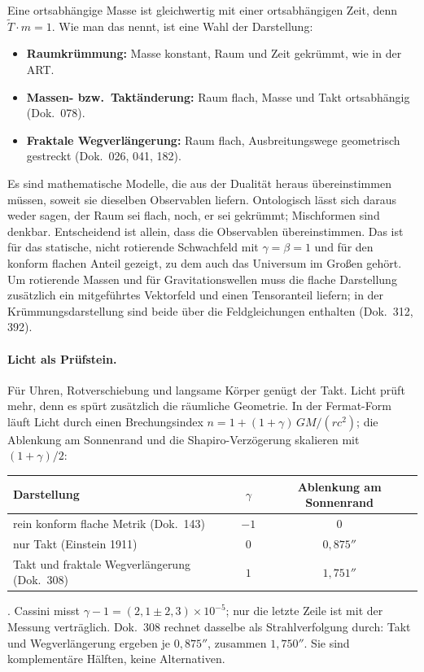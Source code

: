 Eine ortsabhängige Masse ist gleichwertig mit einer ortsabhängigen Zeit, denn
$\tilde T\cdot m=1$. Wie man das nennt, ist eine Wahl der Darstellung:
\begin{itemize}[leftmargin=*,itemsep=1pt]
\item \textbf{Raumkrümmung:} Masse konstant, Raum und Zeit gekrümmt, wie in der ART.
\item \textbf{Massen- bzw.\ Taktänderung:} Raum flach, Masse und Takt ortsabhängig (Dok.~078).
\item \textbf{Fraktale Wegverlängerung:} Raum flach, Ausbreitungswege geometrisch gestreckt
(Dok.~026, 041, 182).
\end{itemize}
Es sind mathematische Modelle, die aus der Dualität heraus übereinstimmen müssen, soweit sie
dieselben Observablen liefern. Ontologisch lässt sich daraus weder sagen, der Raum sei flach,
noch, er sei gekrümmt; Mischformen sind denkbar. Entscheidend ist allein, dass die Observablen
übereinstimmen. Das ist für das statische, nicht rotierende Schwachfeld mit $\gamma=\beta=1$ und
für den konform flachen Anteil gezeigt, zu dem auch das Universum im Großen gehört. Um rotierende
Massen und für Gravitationswellen muss die flache Darstellung zusätzlich ein mitgeführtes
Vektorfeld und einen Tensoranteil liefern; in der Krümmungsdarstellung sind beide über die
Feldgleichungen enthalten (Dok.~312, 392).

\paragraph{Licht als Prüfstein.} Für Uhren, Rotverschiebung und langsame Körper genügt der Takt.
Licht prüft mehr, denn es spürt zusätzlich die räumliche Geometrie. In der Fermat-Form läuft Licht
durch einen Brechungsindex $n=1+(1+\gamma)\,GM/(rc^2)$; die Ablenkung am Sonnenrand und die
Shapiro-Verzögerung skalieren mit $(1+\gamma)/2$:
\begin{center}
\begin{tabular}{lcc}
\toprule
Darstellung & $\gamma$ & Ablenkung am Sonnenrand \\
\midrule
rein konform flache Metrik (Dok.~143) & $-1$ & $0$ \\
nur Takt (Einstein 1911) & $0$ & $0{,}875''$ \\
Takt und fraktale Wegverlängerung (Dok.~308) & $1$ & $1{,}751''$ \\
\bottomrule
\end{tabular}
\end{center}
\KM. Cassini misst $\gamma-1=(2{,}1\pm2{,}3)\times10^{-5}$; nur die letzte Zeile ist mit der
Messung verträglich. Dok.~308 rechnet dasselbe als Strahlverfolgung durch: Takt und
Wegverlängerung ergeben je $0{,}875''$, zusammen $1{,}750''$. Sie sind komplementäre Hälften,
keine Alternativen.

